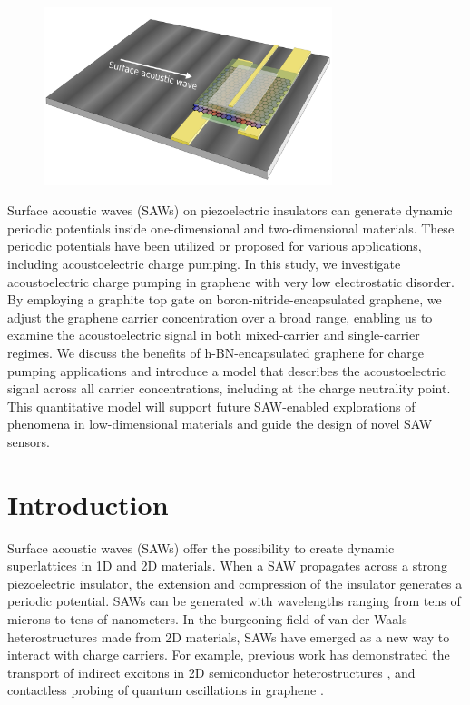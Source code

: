 \documentclass[double,12pt,1in,seploa]{beavtex}
\let\Oldsection\section
\renewcommand{\section}{\FloatBarrier\Oldsection}
\begin{document}
\pagebreak
\begin{figure}
    \includegraphics[width = 0.75\textwidth]{Highlight figure final v2.jpg}
\end{figure}

Surface acoustic waves (SAWs) on piezoelectric insulators can generate dynamic periodic potentials inside one-dimensional and two-dimensional materials. These periodic potentials have been utilized or proposed for various applications, including acoustoelectric charge pumping. In this study, we investigate acoustoelectric charge pumping in graphene with very low electrostatic disorder. By employing a graphite top gate on boron-nitride-encapsulated graphene, we adjust the graphene carrier concentration over a broad range, enabling us to examine the acoustoelectric signal in both mixed-carrier and single-carrier regimes. We discuss the benefits of h-BN-encapsulated graphene for charge pumping applications and introduce a model that describes the acoustoelectric signal across all carrier concentrations, including at the charge neutrality point. This quantitative model will support future SAW-enabled explorations of phenomena in low-dimensional materials and guide the design of novel SAW sensors.
\clearpage

\section{Introduction} 

Surface acoustic waves (SAWs) offer the possibility to create dynamic superlattices in 1D and 2D materials. When a SAW propagates across a strong piezoelectric insulator, the extension and compression of the insulator generates a periodic potential. SAWs can be generated with wavelengths ranging from tens of microns to tens of nanometers. In the burgeoning field of van der Waals heterostructures made from 2D materials, SAWs have emerged as a new way to interact with charge carriers. For example, previous work has demonstrated the transport of indirect excitons in 2D semiconductor heterostructures \cite{peng_long-range_2022}, and contactless probing of quantum oscillations in graphene \cite{fang_quantum_2023}.
\end{document}
